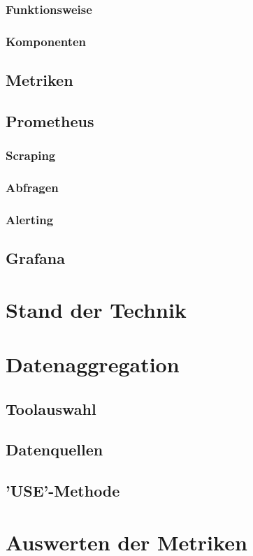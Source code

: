 \documentclass[a4paper,12pt]{scrartcl}
\begin{document}
\subsubsection{Funktionsweise}
\subsubsection{Komponenten}
\subsection{Metriken}
\subsection{Prometheus}
\subsubsection{Scraping}
\subsubsection{Abfragen}
\subsubsection{Alerting}
\subsection{Grafana}

\section{Stand der Technik}

\section{Datenaggregation}
\subsection{Toolauswahl}
\subsection{Datenquellen}
\subsection{'USE'-Methode}

\section{Auswerten der Metriken}
\end{document}
